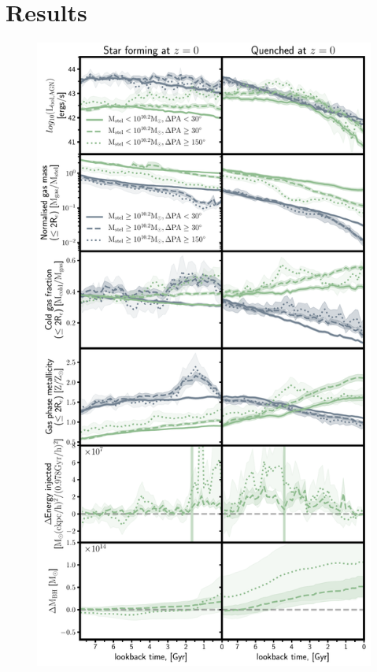 \documentclass[fleqn,usenatbib]{mnras}
\begin{document}
\section{Results} \label{sec:results}
\begin{figure}
	\includegraphics[width=0.95\linewidth]{overall_population/time_evo_letter.pdf}

\end{figure}
\end{document}
